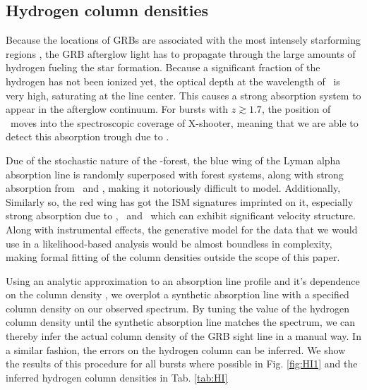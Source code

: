 \documentclass{aa}    %
\begin{document}
\subsection{Hydrogen column densities}

Because the locations of GRBs are associated with the most intensely starforming
regions \citep{Hogg1999, Bloom2002, Fruchter2006}, the GRB afterglow light has
to propagate through the large amounts of hydrogen fueling the star formation.
Because a significant fraction of the hydrogen has not been ionized yet, the
optical depth at the wavelength of \lya~is very high, saturating at the line
center. This causes a strong absorption system to appear in the afterglow
continuum. For bursts with $z \gtrsim 1.7$, the position of \lya~moves into the
spectroscopic coverage of X-shooter, meaning that we are able to detect this
absorption trough due to \lya.

Due of the stochastic nature of the \lya-forest, the blue wing of the Lyman
alpha absorption line is randomly superposed with forest systems, along with
strong absorption from \mnii~and \SIiii, making it notoriously difficult to
model. Additionally, Similarly so, the red wing has got the ISM signatures
imprinted on it, especially strong absorption due to \SIii, \sii~and \nv~which
can exhibit significant velocity structure. Along with instrumental effects, the
generative model for the data that we would use in a likelihood-based analysis
would be almost boundless in complexity, making formal fitting of the column
densities outside the scope of this paper.

Using an analytic approximation to an absorption line profile and it's
dependence on the column density \citep{TepperGarcia2006}, we overplot a
synthetic absorption line with a specified column density on our observed
spectrum. By tuning the value of the hydrogen column density until the synthetic
absorption line matches the spectrum, we can thereby infer the actual column
density of the GRB sight line in a manual way. In a similar fashion, the errors
on the hydrogen column can be inferred. We show the results of this procedure
for all bursts where possible in Fig. \ref{fig:HI1} and the inferred hydrogen
column densities in Tab. \ref{tab:HI}


\end{document}
